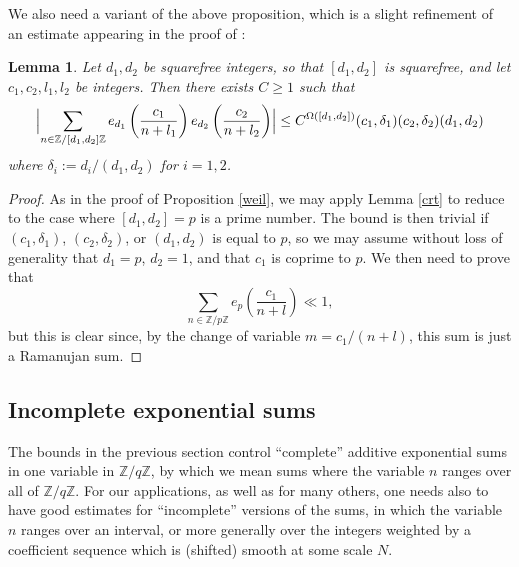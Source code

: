 \documentclass[12pt,a4paper,reqno]{amsart}
\numberwithin{equation}{section}
\theoremstyle{plain}
\newtheorem{lemma}[theorem]{Lemma}
\theoremstyle{definition}
\newcommand\Z{\mathbb{Z}}
\begin{document}
We also need a variant of the above proposition, which is a slight
refinement of an estimate appearing in the proof of \cite[Proposition
11]{zhang}:

\begin{lemma}\label{dork} Let $d_1,d_2$ be squarefree
  integers, so that $[d_1,d_2]$ is squarefree, and let
  $c_1,c_2,l_1,l_2$ be integers.  Then there exists $C\geq 1$ such
  that
$$ 
\Bigl|\sum_{n \in \Z/[d_1,d_2]\Z} e_{d_1}\left( \frac{c_1}{n+l_1}
\right) e_{d_2}\left( \frac{c_2}{n+l_2} \right) \Bigr|\leq
C^{\Omega([d_1,d_2])} (c_1,\delta_1) (c_2,\delta_2) (d_1,d_2)
$$ 
where $\delta_i := d_i / (d_1,d_2)$ for $i=1,2$.
\end{lemma}

\begin{proof} As in the proof of Proposition \ref{weil},
  we may apply Lemma \ref{crt} to reduce to the case where
  $[d_1,d_2]=p$ is a prime number.  The bound is then trivial if
  $(c_1,\delta_1)$, $(c_2, \delta_2)$, or $(d_1,d_2)$ is equal to $p$, so we may
  assume without loss of generality that $d_1 = p$, $d_2 = 1$, and
  that $c_1$ is coprime to $p$.  We then need to prove that
$$ 
\sum_{n \in \Z/p\Z} e_p\left( \frac{c_1}{n+l} \right)
 \ll 1,
$$
but this is clear since, by the change of variable $m = c_1 / (n+l)$,
this sum is just a Ramanujan sum.
\end{proof}

\subsection{Incomplete exponential sums}\label{incomplete-exp-sec}

The bounds in the previous section control ``complete'' additive
exponential sums in one variable in $\Z/q\Z$, by which we mean sums
where the variable $n$ ranges over all of $\Z/q\Z$.  For our
applications, as well as for many others, one needs also to have good
estimates for ``incomplete'' versions of the sums, in which the
variable $n$ ranges over an interval, or more generally over the
integers weighted by a coefficient sequence which is (shifted) smooth
at some scale $N$.
\end{document}
